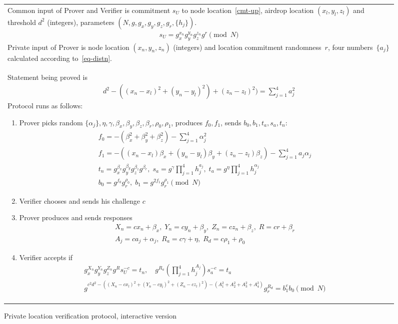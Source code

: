 \documentclass{article}
\begin{document}
\begin{figure}[!htb]
\begin{tabular}{|p{\linewidth}|}
\hline

Common input of Prover and Verifier is
  commitment $s_U$ to node location~\eqref{cmt-up},
  airdrop location $(x_l, y_l, z_l)$ and
  threshold $d^2$ (integers),
  parameters $(N, g, g_x, g_y, g_z, g_r, \{h_j\})$.
\begin{gather}
\label{cmt-up}
  s_U = g_x^{x_n} g_y^{y_n} g_z^{z_n} g^{r} \pmod{N}
\end{gather}
Private input of Prover is
  node location $(x_n, y_n, z_n)$ (integers) and location commitment randomness~$r$,
  four numbers~$\{a_j\}$ calculated
  according to~\eqref{eq-distn}.
\\
Statement being proved is
\begin{gather}
\label{eq-distn}
  d^2 - ((x_n - x_l)^2 + (y_n - y_l)^2) + (z_n - z_l)^2) = \sum_{j=1}^4 a_j^2
\end{gather}
Protocol runs as follows:
\begin{enumerate}
\item
  Prover picks random $\{\alpha_j\}, \eta, \gamma, \beta_x, \beta_y, \beta_z, \beta_r, \rho_0, \rho_1$,
  produces $f_0, f_1$, sends $b_0, b_1, t_a, s_a, t_n$:
\begin{gather}
  f_0 = -(\beta_x^2 + \beta_y^2 + \beta_z^2) - \sum_{j=1}^4 \alpha_j^2   \\
  f_1 = -( (x_n - x_l) \beta_x  + (y_n - y_l) \beta_y  + (z_n - z_l) \beta_z) - \sum_{j=1}^4 a_j \alpha_j   \\
%
  t_n = g_x^{\beta_x} g_y^{\beta_y} g_z^{\beta_z} g^{\beta_r} ,   \;
  s_a = g^{\gamma} \prod_{j=1}^4 h_j^{a_j},   \;
  t_a = g^{\eta} \prod_{j=1}^4 h_j^{\alpha_j} \\
  b_0 = g^{f_0} g_r^{\rho_0},  \;
  b_1 = g^{2 f_1} g_r^{\rho_1} \pmod{N}
\end{gather}
%
\item
  Verifier chooses and sends his challenge $c$
\item
  Prover produces and sends responses
\begin{gather}
  X_n = c x_n + \beta_x,  \;
  Y_n = c y_n + \beta_y,  \;
  Z_n = c z_n + \beta_z,  \;
  R = c r + \beta_r   \\
  A_j = c a_j + \alpha_j, \;
  R_a = c \gamma + \eta,   \;
  R_d = c \rho_1 + \rho_0
\end{gather}
%
\item
  Verifier accepts if
\begin{gather}
\label{verf-linear}
  g_x^{X_n} g_y^{Y_n} g_z^{Z_n} g^{R} s_U^{-c} = t_n, \quad
  g^{R_a} (\prod_{j=1}^4 h_j^{A_j}) s_a^{-c} = t_a \\
\label{verf-distn}
  g^{c^2 d^2 - ((X_n - c x_l)^2 + (Y_n - c y_l)^2 + (Z_n - c z_l)^2) - (A_1^2 + A_2^2 + A_3^2 + A_4^2)} g_r^{R_d} = b_1^{c} b_0  \pmod{N}
\end{gather}
\end{enumerate}
\\
\hline
\end{tabular}
\caption{Private location verification protocol, interactive version}
\label{ip_fig}
\end{figure}
\end{document}
